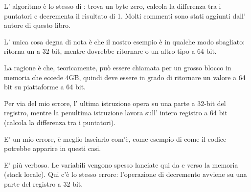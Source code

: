 ﻿




L' algoritmo è lo stesso di : 
trova un byte zero, 
calcola la differenza tra i puntatori e decrementa il risultato di 1.
Molti commenti sono stati aggiunti dall' autore di questo libro.

L' unica cosa degna di nota è che il nostro esempio è in qualche modo sbagliato: \\
 ritorna  un \Tint a 32 bit, mentre dovrebbe ritornare  o un altro tipo a  64 bit.

La ragione è che, teoricamente,  può essere chiamata per un grosso blocco in memoria che eccede
4GB, quindi deve essere in grado di ritornare un valore a 64 bit su piattaforme a 64 bit.

Per via del mio errore, l' ultima istruzione \SUB opera su una parte a 32-bit del registro, mentre la penultima istruzione
\SUB lavora sull' intero registro a 64 bit (calcola la differenza tra i puntatori).

E' un mio errore, è meglio lasciarlo com'è, come esempio di come il codice potrebbe apparire in questi casi.




E' più verboso.
Le variabili vengono spesso lanciate qui da e verso la memoria (stack locale).
Qui c'è lo stesso errore: l'operazione di decremento avviene su una parte del registro a 32 bit.

